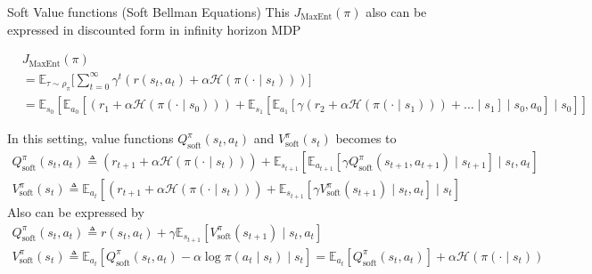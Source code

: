 \documentclass[8pt]{beamer}
\begin{document}
\begin{frame}{Soft Value functions (Soft Bellman Equations)}
    This $J_{\text{MaxEnt}}(\pi)$ also can be expressed in discounted form in infinity horizon MDP

    \[
        \begin{aligned}
            &J_{\text{MaxEnt}}(\pi) \\ 
            &= \mathbb{E}_{\tau \sim \rho_\pi} \Biggl[\sum_{t=0}^\infty \gamma^t (r(s_t, a_t) + \alpha \mathcal{H}(\pi(\cdot \mid s_t)))\Biggr] \\
            &= \mathbb{E}_{s_0}[\mathbb{E}_{a_0}[ (r_1 + \alpha \mathcal{H}(\pi(\cdot \mid s_0))) + \mathbb{E}_{s_1} [\mathbb{E}_{a_1}[\gamma (r_2 + \alpha \mathcal{H}(\pi(\cdot \mid s_1))) + \dots \mid s_1] \mid s_0, a_0] \mid s_0]]
        \end{aligned}
    \]

    In this setting, value functions $Q_{\text{soft}}^\pi (s_t, a_t)$ and $V_{\text{soft}}^\pi (s_t)$ becomes to
    \[
        \begin{gathered}
        Q^\pi_{\text{soft}}(s_t, a_t) \triangleq (r_{t+1} + \alpha \mathcal{H}(\pi(\cdot \mid s_{t}))) + \mathbb{E}_{s_{t+1}} [ \mathbb{E}_{a_{t+1}}[ \gamma Q^\pi_{\text{soft}}(s_{t+1}, a_{t+1}) \mid s_{t+1}] \mid s_t, a_t] \\
        V^\pi_{\text{soft}}(s_t) \triangleq \mathbb{E}_{a_t}[(r_{t+1} + \alpha \mathcal{H}(\pi(\cdot \mid s_t))) + \mathbb{E}_{s_{t+1}}[\gamma V^\pi_{\text{soft}}(s_{t+1}) \mid s_t, a_t] \mid s_t]
        \end{gathered}
    \]
    Also can be expressed by
    \[
    \begin{gathered}
        Q^\pi_{\text{soft}}(s_t, a_t) \triangleq r(s_t, a_t) + \gamma \mathbb{E}_{s_{t+1}} [ V^\pi_{\text{soft}}(s_{t+1}) \mid s_t, a_t] \\
        V^\pi_{\text{soft}}(s_t) \triangleq \mathbb{E}_{a_t}[Q^\pi_{\text{soft}}(s_t, a_t) - 
        \alpha \log{\pi(a_t \mid s_t)} \mid s_t] = \mathbb{E}_{a_t}[Q^\pi_{\text{soft}}(s_t, a_t)] + \alpha\mathcal{H}(\pi(\cdot \mid s_t))
    \end{gathered}
    \]
\end{frame}
\end{document}
